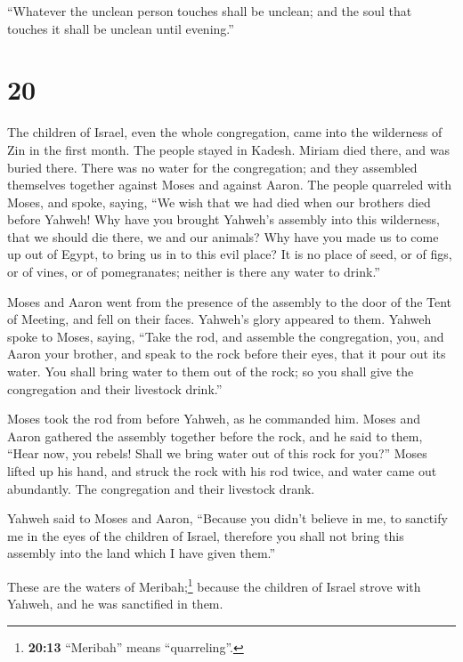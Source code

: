  ``Whatever the unclean person touches shall be unclean;
and the soul that touches it shall be unclean until evening.''

\hypertarget{section-19}{%
\section{20}\label{section-19}}

 The children of Israel, even the whole congregation, came
into the wilderness of Zin in the first month. The people stayed in
Kadesh. Miriam died there, and was buried there.  There
was no water for the congregation; and they assembled themselves
together against Moses and against Aaron.  The people
quarreled with Moses, and spoke, saying, ``We wish that we had died when
our brothers died before Yahweh!  Why have you brought
Yahweh's assembly into this wilderness, that we should die there, we and
our animals?  Why have you made us to come up out of
Egypt, to bring us in to this evil place? It is no place of seed, or of
figs, or of vines, or of pomegranates; neither is there any water to
drink.''

 Moses and Aaron went from the presence of the assembly to
the door of the Tent of Meeting, and fell on their faces. Yahweh's glory
appeared to them.  Yahweh spoke to Moses, saying,
 ``Take the rod, and assemble the congregation, you, and
Aaron your brother, and speak to the rock before their eyes, that it
pour out its water. You shall bring water to them out of the rock; so
you shall give the congregation and their livestock drink.''

 Moses took the rod from before Yahweh, as he commanded
him.  Moses and Aaron gathered the assembly together
before the rock, and he said to them, ``Hear now, you rebels! Shall we
bring water out of this rock for you?''  Moses lifted up
his hand, and struck the rock with his rod twice, and water came out
abundantly. The congregation and their livestock drank.

 Yahweh said to Moses and Aaron, ``Because you didn't
believe in me, to sanctify me in the eyes of the children of Israel,
therefore you shall not bring this assembly into the land which I have
given them.''

 These are the waters of Meribah;\footnote{\textbf{20:13}
  ``Meribah'' means ``quarreling''.} because the children of Israel
strove with Yahweh, and he was sanctified in them.

